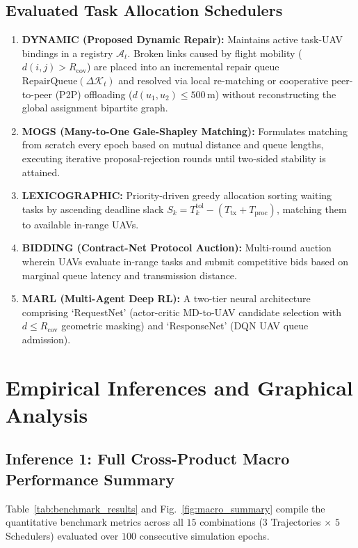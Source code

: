 \documentclass[journal]{IEEEtran}
\begin{document}
\subsection{Evaluated Task Allocation Schedulers}
\begin{enumerate}
    \item \textbf{DYNAMIC (Proposed Dynamic Repair):} Maintains active task-UAV bindings in a registry $\mathcal{A}_t$. Broken links caused by flight mobility ($d(i, j) > R_{\text{cov}}$) are placed into an incremental repair queue $\text{RepairQueue}(\Delta \mathcal{K}_t)$ and resolved via local re-matching or cooperative peer-to-peer (P2P) offloading ($d(u_1, u_2) \le 500\,\text{m}$) without reconstructing the global assignment bipartite graph.
    \item \textbf{MOGS (Many-to-One Gale-Shapley Matching):} Formulates matching from scratch every epoch based on mutual distance and queue lengths, executing iterative proposal-rejection rounds until two-sided stability is attained.
    \item \textbf{LEXICOGRAPHIC:} Priority-driven greedy allocation sorting waiting tasks by ascending deadline slack $S_k = T_k^{\text{tol}} - (T_{\text{tx}} + T_{\text{proc}})$, matching them to available in-range UAVs.
    \item \textbf{BIDDING (Contract-Net Protocol Auction):} Multi-round auction wherein UAVs evaluate in-range tasks and submit competitive bids based on marginal queue latency and transmission distance.
    \item \textbf{MARL (Multi-Agent Deep RL):} A two-tier neural architecture comprising `RequestNet' (actor-critic MD-to-UAV candidate selection with $d \le R_{\text{cov}}$ geometric masking) and `ResponseNet' (DQN UAV queue admission).
\end{enumerate}

\section{Empirical Inferences and Graphical Analysis}

\subsection{Inference 1: Full Cross-Product Macro Performance Summary}
Table~\ref{tab:benchmark_results} and Fig.~\ref{fig:macro_summary} compile the quantitative benchmark metrics across all $15$ combinations ($3$ Trajectories $\times$ $5$ Schedulers) evaluated over $100$ consecutive simulation epochs.
\end{document}

